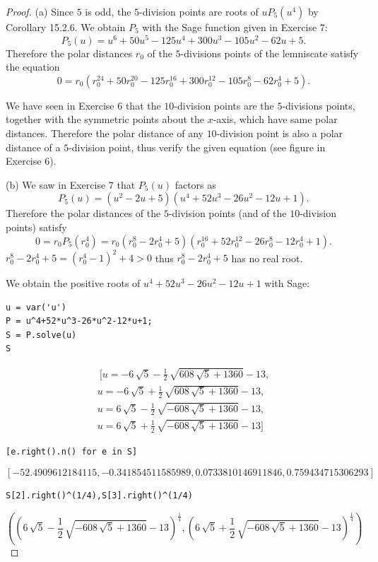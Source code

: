 \documentclass[11pt,a4paper]{article}
\begin{document}
\begin{proof} 
\item[(a)] Since $5$ is odd, the $5$-division points are roots of $uP_5(u^4)$ by Corollary 15.2.6.
We obtain $P_5$ with the Sage function given in Exercise 7:
$$P_5(u) = u^{6} + 50u^{5} - 125u^{4} + 300u^{3} - 105u^{2} - 62u + 5.$$
Therefore the polar distances $r_0$ of the $5$-divisions points of the lemniscate satisfy the equation
$$0 = r_0(r_0^{24} + 50 r_0^{20} - 125 r_0^{16} + 300 r_0^{12} - 105 r_0^8 - 62 r_0^4 + 5).$$

\bigskip

We have seen in Exercise 6 that the $10$-division points are the $5$-divisions points, together with the symmetric points about the $x$-axis, which have same polar distances. Therefore the polar distance of any $10$-division point is also a polar distance of a $5$-division point, thus verify the given equation (see figure in Exercise 6).

\item[(b)]  We saw in Exercise 7 that $P_5(u)$ factors as
$$P_5(u) = (u^{2} - 2u + 5) (u^{4} + 52u^{3} - 26u^{2} - 12u + 1).$$
Therefore the polar distances of the $5$-division points (and of the $10$-division points) satisfy
$$0 = r_0P_5(r_0^4) =r_0 (r_0^{8} - 2r_0^{4} + 5)  (r_0^{16} + 52r_0^{12} - 26r_0^{8} - 12r_0^4 + 1).$$
$r_0^{8} - 2r_0^{4} + 5 = (r_0^4-1)^2 + 4 >0$ thus $r_0^{8} - 2r_0^{4} + 5$ has no real root.

We obtain the positive roots of $u^{4} + 52u^{3} - 26u^{2} - 12u + 1$ with Sage:
\begin{verbatim}
u = var('u')
P = u^4+52*u^3-26*u^2-12*u+1;
S = P.solve(u)
S
\end{verbatim}
\begin{align*}\
[u = -6 \, \sqrt{5} - \frac{1}{2} \, \sqrt{608 \, \sqrt{5} + 1360} - 13, \\
u = -6 \, \sqrt{5} + \frac{1}{2} \, \sqrt{608 \, \sqrt{5} + 1360}- 13, \\
u = 6 \, \sqrt{5} - \frac{1}{2} \, \sqrt{-608 \, \sqrt{5} + 1360}- 13,\\
 u = 6 \, \sqrt{5} + \frac{1}{2} \, \sqrt{-608 \, \sqrt{5} + 1360}- 13]
\end{align*}
\begin{verbatim}
[e.right().n() for e in S]
\end{verbatim}
$$\left[-52.4909612184115, -0.341854511585989, 0.0733810146911846,0.759434715306293\right]$$
\begin{verbatim}
S[2].right()^(1/4),S[3].right()^(1/4)
\end{verbatim}
$$\left({\left(6 \, \sqrt{5} - \frac{1}{2} \, \sqrt{-608 \, \sqrt{5} +
1360} - 13\right)}^{\frac{1}{4}}, {\left(6 \, \sqrt{5} + \frac{1}{2} \,
\sqrt{-608 \, \sqrt{5} + 1360} - 13\right)}^{\frac{1}{4}}\right)$$


\end{proof}
\end{document}
